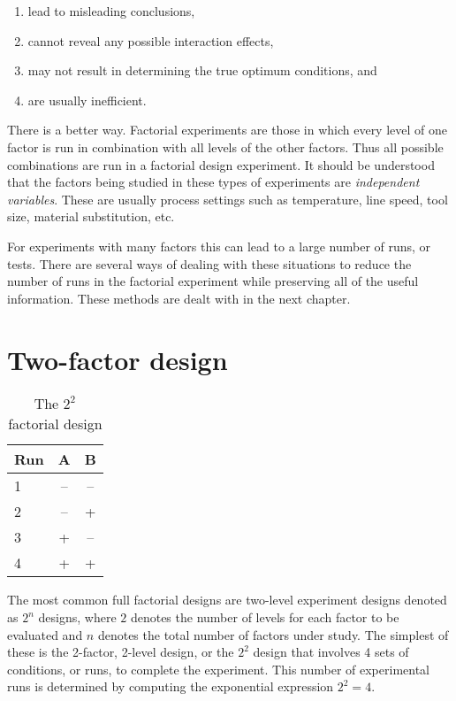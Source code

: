 \begin{enumerate}
\item lead to misleading conclusions,
\item cannot reveal any possible interaction effects,
\item may not result in determining the true optimum conditions, and
\item are usually inefficient.
\end{enumerate}

There is a better way.  Factorial experiments are those in which every level of one factor is run in combination with all levels of the other factors.  Thus all possible combinations are run in a factorial design experiment. It should be understood that the factors being studied in these types of experiments are \textit{independent variables}.  These are usually process settings such as temperature, line speed, tool size, material substitution, etc.  

For experiments with many factors this can lead to a large number of runs, or tests.  There are several ways of dealing with these situations to reduce the number of runs in the factorial experiment while preserving all of the useful information. These methods are dealt with in the next chapter.

\section{Two-factor design}
\begin{table}[h] \caption{The $ 2^{2} $ factorial design }\label{tab1}
\begin{center}
\begin{tabular}{|l|c|c|}
\hline Run & A & B \\ 
\hline 1 & -- & -- \\ 
\hline 2 & -- & + \\ 
\hline 3 & + & -- \\ 
\hline 4 & + & + \\ 
\hline 
\end{tabular} 
\end{center}
\end{table}
The most common full factorial designs are two-level experiment designs denoted as $ 2^{n} $ designs, where $2$ denotes the number of levels for each factor to be evaluated and $n$ denotes the total number of factors under study.  The simplest of these is the 2-factor, 2-level design, or the $ 2^{2} $ design that involves 4 sets of conditions, or runs, to complete the experiment.  This number of experimental runs is determined by computing the exponential expression $ 2^{2} = 4 $.

